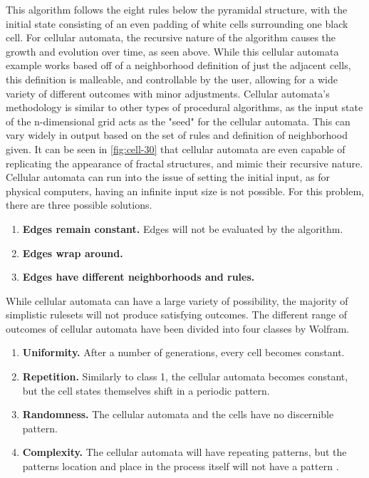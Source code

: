\documentclass[10pt]{report}
\begin{document}
		This algorithm follows the eight rules below the pyramidal structure, with the initial state consisting of an even padding of white cells surrounding one black cell. For cellular automata, the recursive nature of the algorithm causes the growth and evolution over time, as seen above. While this cellular automata example works based off of a neighborhood definition of just the adjacent cells, this definition is malleable, and controllable by the user, allowing for a wide variety of different outcomes with minor adjustments. Cellular automata's methodology is similar to other types of procedural algorithms, as the input state of the n-dimensional grid acts as the "seed" for the cellular automata. This can vary widely in output based on the set of rules and definition of neighborhood given. It can be seen in \autoref{fig:cell-30} that cellular automata are even capable of replicating the appearance of fractal structures, and mimic their recursive nature. Cellular automata can run into the issue of setting the initial input, as for physical computers, having an infinite input size is not possible. For this problem, there are three possible solutions. 
		
		\begin{enumerate}
			\item \textbf{Edges remain constant.} Edges will not be evaluated by the algorithm.
			\item \textbf{Edges wrap around.}
			\item \textbf{Edges have different neighborhoods and rules.} \cite{nature-of-code}
		\end{enumerate}
		
		While cellular automata can have a large variety of possibility, the majority of simplistic rulesets will not produce satisfying outcomes. The different range of outcomes of cellular automata have been divided into four classes by Wolfram.
		
		\begin{enumerate}
			\item \textbf{Uniformity.} After a number of generations, every cell becomes constant.
			\item \textbf{Repetition.} Similarly to class 1, the cellular automata becomes constant, but the cell states themselves shift in a periodic pattern.
			\item \textbf{Randomness.} The cellular automata and the cells have no discernible pattern. 
			\item \textbf{Complexity.} The cellular automata will have repeating patterns, but the patterns location and place in the process itself will not have a pattern \cite{nature-of-code}. 
		\end{enumerate}
	
\end{document}
